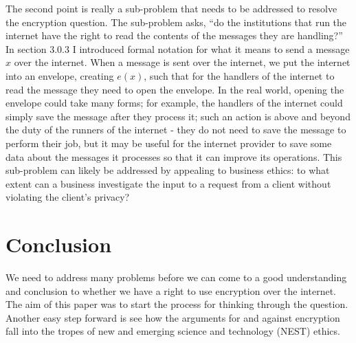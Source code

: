 \documentclass[11pt]{article}
\begin{document}
The second point is really a sub-problem that needs to be addressed to resolve the encryption question.
The sub-problem asks, ``do the institutions that run the internet have the right to read the contents of the messages they are handling?''
In section 3.0.3 I introduced formal notation for what it means to send a message $x$ over the internet.
When a message is sent over the internet, we put the internet into an envelope, creating $e(x)$, such that for the handlers of the internet to read the message they need to open the envelope.
In the real world, opening the envelope could take many forms; for example, the handlers of the internet could simply save the message after they process it; such an action is above and beyond the duty of the runners of the internet - they do not need to save the message to perform their job, but it may be useful for the internet provider to save some data about the messages it processes so that it can improve its operations.
This sub-problem can likely be addressed by appealing to business ethics: to what extent can a business investigate the input to a request from a client without violating the client's privacy?

\section{Conclusion}
We need to address many problems before we can come to a good understanding and conclusion to whether we have a right to use encryption over the internet.
The aim of this paper was to start the process for thinking through the question.
Another easy step forward is see how the arguments for and against encryption fall into the tropes of new and emerging science and technology (NEST) ethics.

%
%
\end{document}
